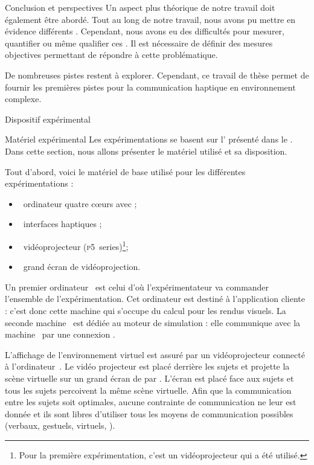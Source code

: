 \documentclass[myfrancais,ngerman,english,french]{mythesis}
\begin{document}
\begin{mychapter+}{Conclusion et perspectives}
		Un aspect plus théorique de notre travail doit également être abordé.
		Tout au long de notre travail, nous avons pu mettre en évidence différents .
		Cependant, nous avons eu des difficultés pour mesurer, quantifier ou même qualifier ces .
		Il est nécessaire de définir des mesures objectives permettant de répondre à cette problématique.

		De nombreuses pistes restent à explorer.
		Cependant, ce travail de thèse permet de fournir les premières pistes pour la communication haptique en environnement complexe.
	\end{mychapter+}
	\mybiblio%
	\myglossary
	\myappendix
	\begin{mychapter}{Dispositif expérimental}
		\begin{mysection}{Matériel expérimental}
			Les expérimentations se basent sur l' présenté dans le .
			Dans cette section, nous allons présenter le matériel utilisé et sa disposition.

			Tout d'abord, voici le matériel de base utilisé pour les différentes expérimentations :
			\begin{itemize}
				\item {}~ordinateur quatre cœurs \myIntelCore avec ;
				\item {}~interfaces haptiques \myOmni;
				\item {}~vidéoprojecteur \myACER (\textsc{p5}~series)\footnote{Pour la première expérimentation, c'est un vidéoprojecteur \myCasioXJ qui a été utilisé.};
				\item {}~grand écran de vidéoprojection.
			\end{itemize}

			Un premier ordinateur~ est celui d'où l'expérimentateur va commander l'ensemble de l'expérimentation.
			Cet ordinateur est destiné à l'application cliente  : c'est donc cette machine qui s'occupe du calcul pour les rendus visuels.
			La seconde machine~ est dédiée au moteur de simulation  : elle communique avec la machine~ par une connexion \myTCPIP.

			L'affichage de l'environnement virtuel est assuré par un vidéoprojecteur connecté à l'ordinateur~.
			Le vidéo projecteur est placé derrière les sujets et projette la scène virtuelle sur un grand écran de  par .
			L'écran est placé face aux sujets et tous les sujets percoivent la même scène virtuelle.
			Afin que la communication entre les sujets soit optimales, aucune contrainte de communication ne leur est donnée et ils sont libres d'utiliser tous les moyens de communication possibles (verbaux, gestuels, virtuels, \myetc).


\end{mysection}
\end{mychapter}
\end{document}
